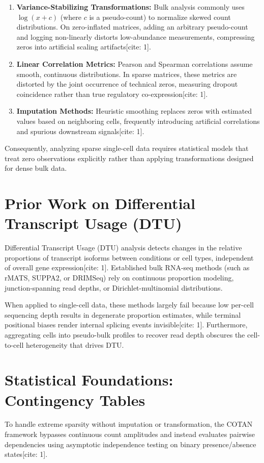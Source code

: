 \begin{enumerate}
    \item \textbf{Variance-Stabilizing Transformations:} Bulk analysis commonly uses $\log(x+c)$ (where $c$ is a pseudo-count) to normalize skewed count distributions. On zero-inflated matrices, adding an arbitrary pseudo-count and logging non-linearly distorts low-abundance measurements, compressing zeros into artificial scaling artifacts[cite: 1].
    
    \item \textbf{Linear Correlation Metrics:} Pearson and Spearman correlations assume smooth, continuous distributions. In sparse matrices, these metrics are distorted by the joint occurrence of technical zeros, measuring dropout coincidence rather than true regulatory co-expression[cite: 1].
    
    \item \textbf{Imputation Methods:} Heuristic smoothing replaces zeros with estimated values based on neighboring cells, frequently introducing artificial correlations and spurious downstream signals[cite: 1].
\end{enumerate}

Consequently, analyzing sparse single-cell data requires statistical models that treat zero observations explicitly rather than applying transformations designed for dense bulk data.

\section{Prior Work on Differential Transcript Usage (DTU)}
Differential Transcript Usage (DTU) analysis detects changes in the relative proportions of transcript isoforms between conditions or cell types, independent of overall gene expression[cite: 1]. Established bulk RNA-seq methods (such as rMATS, SUPPA2, or DRIMSeq) rely on continuous proportion modeling, junction-spanning read depths, or Dirichlet-multinomial distributions.

When applied to single-cell data, these methods largely fail because low per-cell sequencing depth results in degenerate proportion estimates, while terminal positional biases render internal splicing events invisible[cite: 1]. Furthermore, aggregating cells into pseudo-bulk profiles to recover read depth obscures the cell-to-cell heterogeneity that drives DTU.

\section{Statistical Foundations: Contingency Tables}
To handle extreme sparsity without imputation or transformation, the COTAN framework bypasses continuous count amplitudes and instead evaluates pairwise dependencies using asymptotic independence testing on binary presence/absence states[cite: 1].

